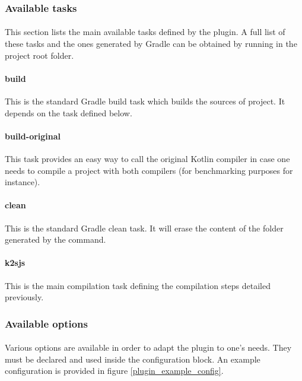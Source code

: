 \subsubsection{Available tasks}

\paragraph{} This section lists the main available tasks defined by the plugin. A full 
list of these tasks and the ones generated by Gradle can be obtained by running  in the project root folder.

\paragraph{build} This is the standard Gradle build task which builds the sources of project. It 
depends on the  task defined below.

\paragraph{build-original} This task provides an easy way to call the original Kotlin compiler in 
case one needs to compile a project with both compilers (for benchmarking purposes for instance).

\paragraph{clean} This is the standard Gradle clean task. It will erase the content of the 
 folder generated by the  command.

\paragraph{k2sjs} This is the main compilation task defining the compilation steps detailed 
previously.

\subsubsection{Available options} \label{plugin_options}

\paragraph{} Various options are available in order to adapt the  plugin to 
one's needs. They must be declared and used inside the  configuration block. An 
example configuration is provided in figure \ref{plugin_example_config}.


